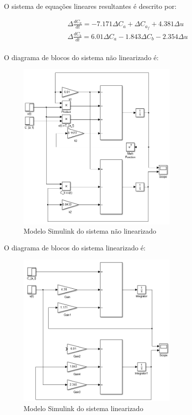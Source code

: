 \documentclass[a4paper,12pt]{report}
\begin{document}
O sistema de equações lineares resultantes é descrito por:

\begin{align}
\Delta\frac{dC_a}{dt} = -7.171 \Delta C_a + \Delta C_{a_f} + 4.381\Delta u \\
\Delta\frac{dC_b}{dt} = 6.01 \Delta C_a -1.843\Delta C_b - 2.354 \Delta u\\
\end{align}

O diagrama de blocos do sistema não linearizado é:

 \begin{figure}[H]
  \centering
  \includegraphics[width=0.7\textwidth]{Imagens/Q2Simu.png}
  \caption{Modelo Simulink do sistema não linearizado}
  \end{figure}

O diagrama de blocos do sistema linearizado é:

 \begin{figure}[H]
  \centering
  \includegraphics[width=0.7\textwidth]{Imagens/Q3Simu.png}
  \caption{Modelo Simulink do sistema linearizado}
  \end{figure}
\end{document}
